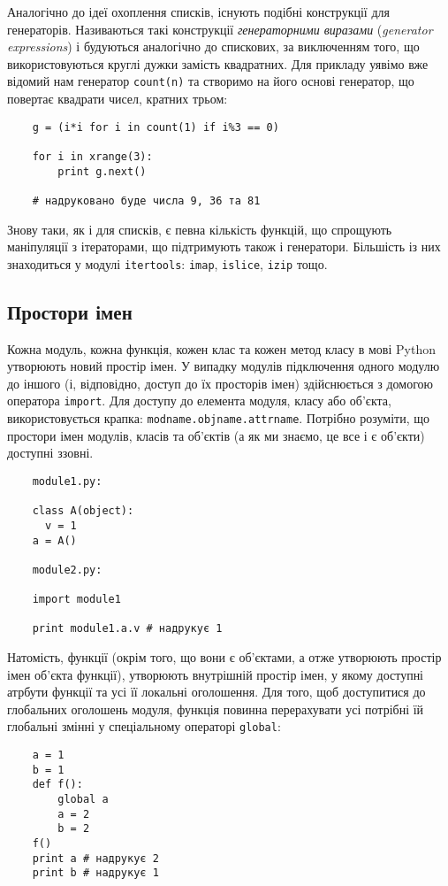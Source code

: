 \documentclass[a4paper, 12pt, onsedie]{article}
\begin{document}
    Аналогічно до ідеї охоплення списків, існують подібні конструкції для
    генераторів. Називаються такі конструкції \emph{генераторними виразами} 
    (\emph{generator expressions}) і будуються аналогічно до спискових, за
    виключенням того, що використовуються круглі дужки замість квадратних.
    Для прикладу уявімо вже відомий нам генератор \texttt{count(n)} та 
    створимо на його основі генератор, що повертає квадрати чисел, кратних
    трьом:
    \begin{verbatim}
    g = (i*i for i in count(1) if i%3 == 0)

    for i in xrange(3): 
        print g.next()

    # надруковано буде числа 9, 36 та 81
    \end{verbatim}

    Знову таки, як і для списків, є певна кількість функцій, що спрощують
    маніпуляції з ітераторами, що підтримують також і генератори. 
    Більшість із них знаходиться у модулі \texttt{itertools}:
    \texttt{imap}, \texttt{islice}, \texttt{izip} тощо.

\subsection{Простори імен}
    Кожна модуль, кожна функція, кожен клас та кожен метод класу в мові Python утворюють 
    новий простір імен. У випадку модулів підключення одного модулю до іншого (і, відповідно,
    доступ до їх просторів імен) здійснюється з домогою оператора \texttt{import}. Для доступу
    до елемента модуля, класу або об'єкта, використовується крапка: 
    \texttt{modname.objname.attrname}. Потрібно розуміти, що простори імен модулів, класів та
    об'єктів (а як ми знаємо, це все і є об'єкти) доступні ззовні.
    \begin{verbatim}
    module1.py:

    class A(object):
      v = 1
    a = A()

    module2.py:

    import module1

    print module1.a.v # надрукує 1
    \end{verbatim}
    Натомість, функції (окрім того, що вони є об'єктами, а отже утворюють простір імен об'єкта
    функції), утворюють внутрішній простір імен, у якому доступні атрбути функції та усі її
    локальні оголошення. Для того, щоб доступитися до глобальних оголошень модуля, функція повинна
    перерахувати усі потрібні їй глобальні змінні у спеціальному операторі \texttt{global}:
    \begin{verbatim}
    a = 1
    b = 1
    def f():
        global a
        a = 2
        b = 2
    f()
    print a # надрукує 2
    print b # надрукує 1
    \end{verbatim}
\end{document}
